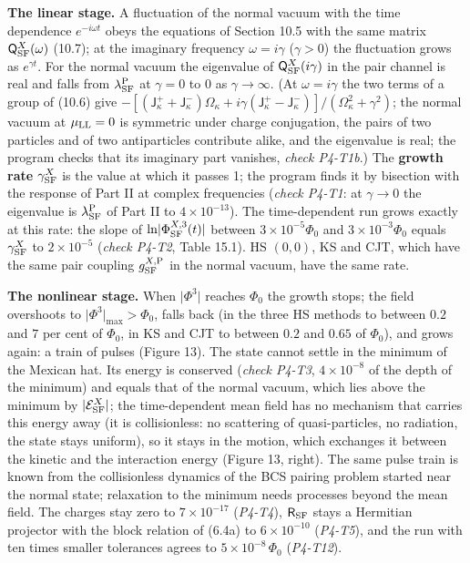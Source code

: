 \documentclass[
  10pt,
]{article}
\begin{document}
\textbf{The linear stage.} A fluctuation of the normal vacuum with the
time dependence \(e^{-i\omega t}\) obeys the equations of Section 10.5
with the same matrix \(\mathsf Q^X_{\rm SF}(\omega)\) (10.7); at the
imaginary frequency \(\omega=i\gamma\) (\(\gamma>0\)) the fluctuation
grows as \(e^{\gamma t}\). For the normal vacuum the eigenvalue of
\(\mathsf Q^X_{\rm SF}(i\gamma)\) in the pair channel is real and falls
from \(\lambda^{\rm P}_{\rm SF}\) at \(\gamma=0\) to 0 as
\(\gamma\to\infty\). (At \(\omega=i\gamma\) the two terms of a group of
(10.6) give
\(-[(\mathsf J^+_\kappa+\mathsf J^-_\kappa)\Omega_\kappa+i\gamma(\mathsf J^+_\kappa-\mathsf J^-_\kappa)]/(\Omega_\kappa^2+\gamma^2)\);
the normal vacuum at \(\mu_{\rm LL}=0\) is symmetric under charge
conjugation, the pairs of two particles and of two antiparticles
contribute alike, and the eigenvalue is real; the program checks that
its imaginary part vanishes, \emph{check P4-T1b}.) The \textbf{growth
rate} \(\gamma^X_{\rm SF}\) is the value at which it passes 1; the
program finds it by bisection with the response of Part II at complex
frequencies (\emph{check P4-T1}: at \(\gamma\to0\) the eigenvalue is
\(\lambda^{\rm P}_{\rm SF}\) of Part II to \(4\times10^{-13}\)). The
time-dependent run grows exactly at this rate: the slope of
\(\ln\lvert\Phi^{X,3}_{\rm SF}(t)\rvert\) between
\(3\times10^{-5}\Phi_0\) and \(3\times10^{-3}\Phi_0\) equals
\(\gamma^X_{\rm SF}\) to \(2\times10^{-5}\) (\emph{check P4-T2}, Table
15.1). HS \((0,0)\), KS and CJT, which have the same pair coupling
\(g^{X,{\rm P}}_{\rm SF}\) in the normal vacuum, have the same rate.

\textbf{The nonlinear stage.} When \(\lvert\Phi^3\rvert\) reaches
\(\Phi_0\) the growth stops; the field overshoots to
\(\lvert\Phi^3\rvert_{\max}>\Phi_0\), falls back (in the three HS
methods to between \(0.2\) and \(7\) per cent of \(\Phi_0\), in KS and
CJT to between \(0.2\) and \(0.65\) of \(\Phi_0\)), and grows again: a
train of pulses (Figure 13). The state cannot settle in the minimum of
the Mexican hat. Its energy is conserved (\emph{check P4-T3},
\(4\times10^{-8}\) of the depth of the minimum) and equals that of the
normal vacuum, which lies above the minimum by
\(\lvert\mathcal E^X_{\rm SF}\rvert\); the time-dependent mean field has
no mechanism that carries this energy away (it is collisionless: no
scattering of quasi-particles, no radiation, the state stays uniform),
so it stays in the motion, which exchanges it between the kinetic and
the interaction energy (Figure 13, right). The same pulse train is known
from the collisionless dynamics of the BCS pairing problem started near
the normal state; relaxation to the minimum needs processes beyond the
mean field. The charges stay zero to \(7\times10^{-17}\) (\emph{P4-T4}),
\(\mathsf R_{\rm SF}\) stays a Hermitian projector with the block
relation of (6.4a) to \(6\times10^{-10}\) (\emph{P4-T5}), and the run
with ten times smaller tolerances agrees to \(5\times10^{-8}\,\Phi_0\)
(\emph{P4-T12}).
\end{document}
